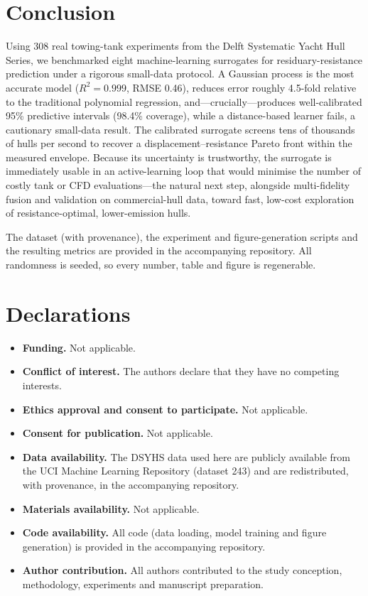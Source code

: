 \documentclass[pdflatex,sn-mathphys-num]{sn-jnl}%
\theoremstyle{thmstyleone}%
\theoremstyle{thmstyletwo}%
\theoremstyle{thmstylethree}%
\begin{document}
\section{Conclusion}\label{sec:conclusion}

Using 308 real towing-tank experiments from the Delft Systematic Yacht Hull
Series, we benchmarked eight machine-learning surrogates for residuary-resistance
prediction under a rigorous small-data protocol. A Gaussian process is the most
accurate model ($R^{2}=0.999$, RMSE 0.46), reduces error roughly 4.5-fold
relative to the traditional polynomial regression, and---crucially---produces
well-calibrated 95\% predictive intervals (98.4\% coverage), while a
distance-based learner fails, a cautionary small-data result. The calibrated
surrogate screens tens of thousands of hulls per second to recover a
displacement--resistance Pareto front within the measured envelope. Because its
uncertainty is trustworthy, the surrogate is immediately usable in an
active-learning loop that would minimise the number of costly tank or CFD
evaluations---the natural next step, alongside multi-fidelity fusion and
validation on commercial-hull data, toward fast, low-cost exploration of
resistance-optimal, lower-emission hulls.

\backmatter

The dataset (with provenance), the experiment and figure-generation scripts and
the resulting metrics are provided in the accompanying repository. All randomness
is seeded, so every number, table and figure is regenerable.

\section*{Declarations}

\begin{itemize}
\item \textbf{Funding.} Not applicable.
\item \textbf{Conflict of interest.} The authors declare that they have no
competing interests.
\item \textbf{Ethics approval and consent to participate.} Not applicable.
\item \textbf{Consent for publication.} Not applicable.
\item \textbf{Data availability.} The DSYHS data used here are publicly available
from the UCI Machine Learning Repository (dataset 243) and are redistributed,
with provenance, in the accompanying repository.
\item \textbf{Materials availability.} Not applicable.
\item \textbf{Code availability.} All code (data loading, model training and
figure generation) is provided in the accompanying repository.
\item \textbf{Author contribution.} All authors contributed to the study
conception, methodology, experiments and manuscript preparation.
\end{itemize}


\end{document}
